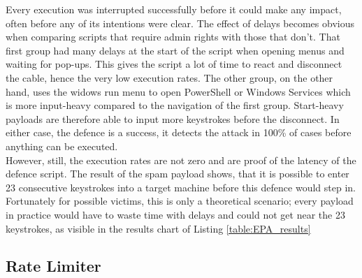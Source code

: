 Every execution was interrupted successfully before it could make any impact, often before any of its intentions were clear. The effect of delays becomes obvious when comparing scripts that require admin rights with those that don't. That first group had many delays at the start of the script when opening menus and waiting for pop-ups. This gives the script a lot of time to react and disconnect the cable, hence the very low execution rates. The other group, on the other hand, uses the widows run menu to open PowerShell or Windows Services which is more input-heavy compared to the navigation of the first group. Start-heavy payloads are therefore able to input more keystrokes before the disconnect. In either case, the defence is a success, it detects the attack in 100\% of cases before anything can be executed. \\
However, still, the execution rates are not zero and are proof of the latency of the defence script. The result of the spam payload shows, that it is possible to enter 23 consecutive keystrokes into a target machine before this defence would step in. Fortunately for possible victims, this is only a theoretical scenario; every payload in practice would have to waste time with delays and could not get near the 23 keystrokes, as visible in the results chart of Listing \ref{table:EPA_results}\


\subsection{Rate Limiter}

